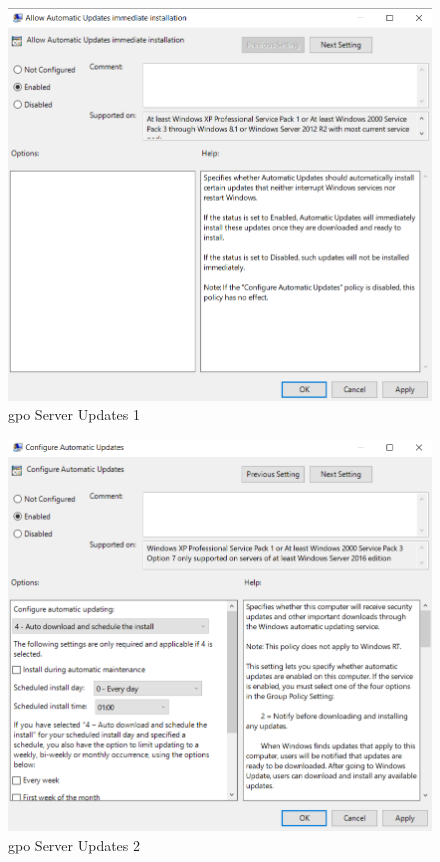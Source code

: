 \begin{minipage}{0.5\linewidth}
    \begin{figure}[H]
        \centering
        \includegraphics[width=\linewidth]{../img/Updates/client-allow-immediate-updates.png}
        \caption{\acrshort{gpo} Server Updates 1}
    \end{figure}
\end{minipage}
\begin{minipage}{0.5\linewidth}
    \begin{figure}[H]
        \centering
        \includegraphics[width=\linewidth]{../img/Updates/server-configure-automatic-updates.png}
        \caption{\acrshort{gpo} Server Updates 2}
    \end{figure}
\end{minipage}\\
